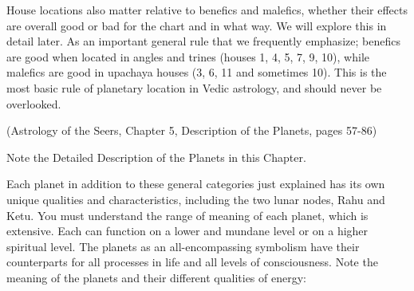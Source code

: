  

House locations also matter relative to benefics and malefics, whether their effects are overall good or bad for the chart and in what way. We will explore this in detail later. As an important general rule that we frequently emphasize; benefics are good when located in angles and trines (houses 1, 4, 5, 7, 9, 10), while malefics are good in upachaya houses (3, 6, 11 and sometimes 10). This is the most basic rule of planetary location in Vedic astrology, and should never be overlooked.

 

 (Astrology of the Seers, Chapter 5, Description of the Planets, pages 57-86)

 

Note the Detailed Description of the Planets in this Chapter.

 

Each planet in addition to these general categories just explained has its own unique qualities and characteristics, including the two lunar nodes, Rahu and Ketu. You must understand the range of meaning of each planet, which is extensive. Each can function on a lower and mundane level or on a higher spiritual level. The planets as an all-encompassing symbolism have their counterparts for all processes in life and all levels of consciousness. Note the meaning of the planets and their different qualities of energy:

 


